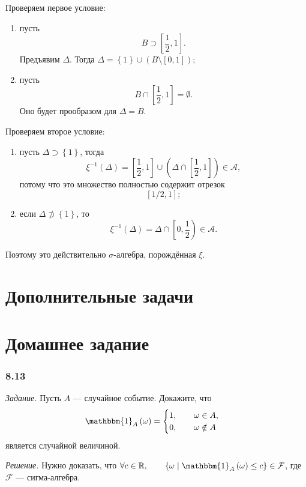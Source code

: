 \begin{enumerate}[label=\alph*)]
Проверяем первое условие:
\begin{enumerate}[label=\alph*)]
\item пусть
$$B \supset \left[ \frac{1}{2}, 1 \right].$$
Предъявим $ \Delta $.
Тогда $ \Delta = \left\{ 1 \right\} \cup \left( B \setminus \left[ 0, 1 \right] \right) $;
\item пусть
$$B \cap \left[ \frac{1}{2}, 1 \right] = \emptyset.$$
Оно будет прообразом для $ \Delta = B$.
\end{enumerate}

Проверяем второе условие:
\begin{enumerate}[label=\alph*)]
\item пусть $ \Delta \supset \left\{ 1 \right\} $, тогда
$$ \xi^{-1} \left( \Delta \right) =
\left[ \frac{1}{2}, 1 \right] \cup \left( \Delta \cap \left[ \frac{1}{2}, 1 \right] \right) \in
\mathcal{A},$$
потому что это множество полностью содержит отрезок
$$ \left[ 1/2, 1 \right];$$
\item если $ \Delta \not\supset \left\{ 1 \right\} $, то
$$ \xi^{-1} \left( \Delta \right) =
\Delta \cap \left[ 0, \frac{1}{2} \right) \in
\mathcal{A}.$$
\end{enumerate}

Поэтому это действительно $ \sigma $-алгебра, порождённая $ \xi $.
\end{enumerate}

\section*{Дополнительные задачи}

\section*{Домашнее задание}

\subsubsection*{8.13}

\textit{Задание.} Пусть $A$ --- случайное событие.
Докажите, что
$$ \mathbbm{1}_A \left( \omega \right) =
\begin{cases}
1, \qquad \omega \in A, \\
0, \qquad \omega \notin A
\end{cases}$$
является случайной величиной.

\textit{Решение.}
Нужно доказать,
что $ \forall c \in \mathbb{R}, \qquad \left\{ \omega \; \middle| \; \mathbbm{1}_A \left( \omega \right) \leq c \right\} \in \mathcal{F} $,
где $ \mathcal{F} $ --- сигма-алгебра.


